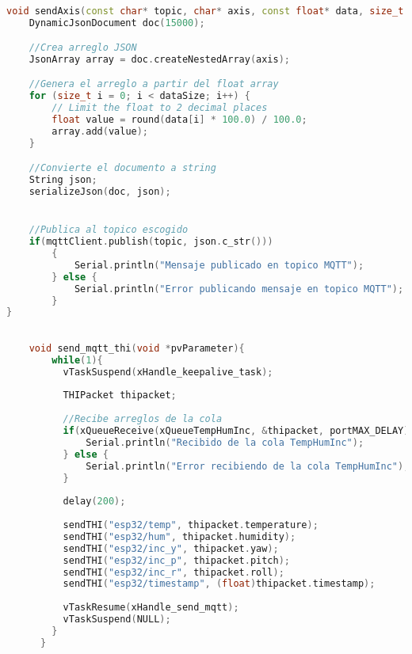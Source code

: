 \begin{lstlisting}[language=C++, caption=Tarea de conversión a tipo JSON de un eje de aceleración]

void sendAxis(const char* topic, char* axis, const float* data, size_t dataSize) {
    DynamicJsonDocument doc(15000);

    //Crea arreglo JSON
    JsonArray array = doc.createNestedArray(axis);

    //Genera el arreglo a partir del float array
    for (size_t i = 0; i < dataSize; i++) {
        // Limit the float to 2 decimal places
        float value = round(data[i] * 100.0) / 100.0;
        array.add(value);
    }

    //Convierte el documento a string
    String json;
    serializeJson(doc, json);


    //Publica al topico escogido
    if(mqttClient.publish(topic, json.c_str()))
        {
            Serial.println("Mensaje publicado en topico MQTT");
        } else {
            Serial.println("Error publicando mensaje en topico MQTT");
        }
}

\end{lstlisting}


\begin{lstlisting}[language=C++, caption=Tarea de envío de datos de variables cuasi-estáticas vía MQTT]

    void send_mqtt_thi(void *pvParameter){
        while(1){
          vTaskSuspend(xHandle_keepalive_task);
      
          THIPacket thipacket;
      
          //Recibe arreglos de la cola
          if(xQueueReceive(xQueueTempHumInc, &thipacket, portMAX_DELAY)){
              Serial.println("Recibido de la cola TempHumInc");
          } else {
              Serial.println("Error recibiendo de la cola TempHumInc");
          }
      
          delay(200);
      
          sendTHI("esp32/temp", thipacket.temperature);
          sendTHI("esp32/hum", thipacket.humidity);
          sendTHI("esp32/inc_y", thipacket.yaw);
          sendTHI("esp32/inc_p", thipacket.pitch);
          sendTHI("esp32/inc_r", thipacket.roll);
          sendTHI("esp32/timestamp", (float)thipacket.timestamp);
      
          vTaskResume(xHandle_send_mqtt);
          vTaskSuspend(NULL);
        }
      }
      
\end{lstlisting}
    

